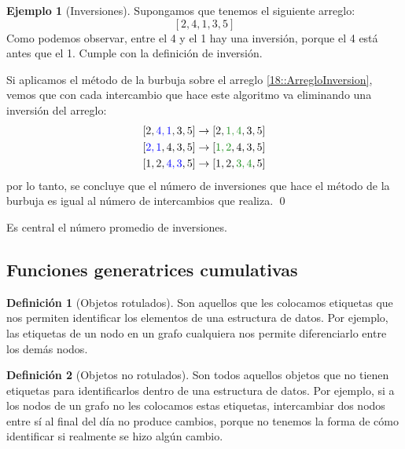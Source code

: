 \documentclass[english, spanish, fleqn, 10pt]{article}
\numberwithin{equation}{section}
\newcommand{\ncorchetes}[1]{\left[ #1 \right]}
\theoremstyle{definition}
\newtheorem{definition}{Definición}[section]
\newtheorem{beforeExample}{Ejemplo}[section]
\newenvironment{ejemplo}[1][]{\begin{beforeExample}[#1]\renewcommand{\qedsymbol}{$\blacksquare$}}{\qed\end{beforeExample}}
\begin{document}
\begin{ejemplo}[Inversiones]
	Supongamos que tenemos el siguiente arreglo:
	\begin{equation}\label{18::ArregloInversion}
	\ncorchetes{2, 4, 1, 3, 5}
	\end{equation}
	Como podemos observar, entre el 4 y el 1 hay una inversión, porque el 4 está antes que el 1. Cumple con la definición de inversión.
	
	Si aplicamos el método de la burbuja sobre el arreglo \eqref{18::ArregloInversion}, vemos que con cada intercambio que hace este algoritmo va eliminando una inversión del arreglo:
	\begin{align*}
	\ncorchetes{2, \textcolor{blue}{4, 1}, 3, 5} &\rightarrow \ncorchetes{2, \textcolor{green!50!black!90}{1, 4}, 3, 5}\\
	\ncorchetes{\textcolor{blue}{2, 1}, 4, 3, 5} &\rightarrow \ncorchetes{ \textcolor{green!50!black!90}{1, 2}, 4, 3, 5}\\
	\ncorchetes{1, 2, \textcolor{blue}{4, 3},  5} &\rightarrow \ncorchetes{ 1, 2, \textcolor{green!50!black!90}{3, 4},  5}
	\end{align*}
	por lo tanto, se concluye que el número de inversiones que hace el método de la burbuja es igual al número de intercambios que realiza.
\end{ejemplo}

Es central el número promedio de inversiones.

\subsection{Funciones generatrices cumulativas}
\begin{definition}[Objetos rotulados]
	Son aquellos que les colocamos etiquetas que nos permiten identificar los elementos de una estructura de datos. Por ejemplo, las etiquetas de un nodo en un grafo cualquiera nos permite diferenciarlo entre los demás nodos.
\end{definition}

\begin{definition}[Objetos no rotulados]
	Son todos aquellos objetos que no tienen etiquetas para identificarlos dentro de una estructura de datos. Por ejemplo, si a los nodos de un grafo no les colocamos estas etiquetas, intercambiar dos nodos entre sí al final del día no produce cambios, porque no tenemos la forma de cómo identificar si realmente se hizo algún cambio.
\end{definition}
\end{document}
